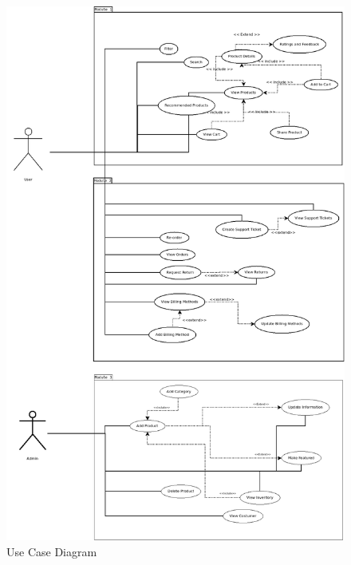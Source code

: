 \documentclass{report}
\begin{document}
\begin{figure}[h!]
\includegraphics[width=\linewidth]{Diagrams/UseCaseDiagram.png}
\caption{Use Case Diagram}
\label{fig:UseCase}
\end{figure}
\end{document}
